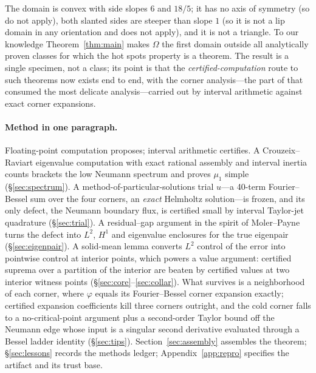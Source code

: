 \documentclass[11pt]{article}
\begin{document}
The domain is convex with side slopes $6$ and $18/5$; it has no axis of
symmetry (so \cite{JerisonNadirashvili,SymQuad} do not apply), both
slanted sides are steeper than slope $1$ (so it is not a lip domain in
any orientation and \cite{AtarBurdzy} does not apply), and it is not a
triangle. To our knowledge Theorem~\ref{thm:main} makes $\Omega$ the
first domain outside all analytically proven classes for which the hot
spots property is a theorem. The result is a single specimen, not a
class; its point is that the \emph{certified-computation} route to such
theorems now exists end to end, with the corner analysis---the part of
\cite{JudgeMondal} that consumed the most delicate analysis---carried
out by interval arithmetic against exact corner expansions.

\paragraph{Method in one paragraph.}
Floating-point computation proposes; interval arithmetic certifies. A
Crouzeix--Raviart eigenvalue computation with exact rational assembly
and interval inertia counts brackets the low Neumann spectrum and proves
$\mu_1$ simple (\S\ref{sec:spectrum}). A method-of-particular-solutions
trial $u$---a 40-term Fourier--Bessel sum over the four corners, an
\emph{exact} Helmholtz solution---is frozen, and its only defect, the
Neumann boundary flux, is certified small by interval Taylor-jet
quadrature (\S\ref{sec:trial}). A residual--gap argument in the spirit
of Moler--Payne turns the defect into $L^2$, $H^1$ and eigenvalue
enclosures for the true eigenpair (\S\ref{sec:eigenpair}). A solid-mean
lemma converts $L^2$ control of the error into pointwise control at
interior points, which powers a value argument: certified suprema over a
partition of the interior are beaten by certified values at two interior
witness points (\S\ref{sec:core}--\ref{sec:collar}). What survives is a
neighborhood of each corner, where $\varphi$ equals its Fourier--Bessel
corner expansion exactly; certified expansion coefficients kill three
corners outright, and the cold corner falls to a no-critical-point
argument plus a second-order Taylor bound off the Neumann edge whose
input is a singular second derivative evaluated through a Bessel ladder
identity (\S\ref{sec:tips}). Section~\ref{sec:assembly} assembles the
theorem; \S\ref{sec:lessons} records the methods ledger;
Appendix~\ref{app:repro} specifies the artifact and its trust base.
\end{document}
